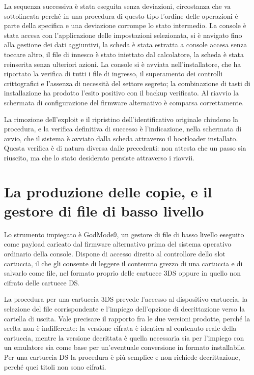 La sequenza successiva è stata eseguita senza deviazioni, circostanza che va sottolineata perché in una procedura di questo tipo l'ordine delle operazioni è parte della specifica e una deviazione corrompe lo stato intermedio. La console è stata accesa con l'applicazione delle impostazioni selezionata, si è navigato fino alla gestione dei dati aggiuntivi, la scheda è stata estratta a console accesa senza toccare altro, il file di innesco è stato iniettato dal calcolatore, la scheda è stata reinserita senza ulteriori azioni. La console si è avviata nell'installatore, che ha riportato la verifica di tutti i file di ingresso, il superamento dei controlli crittografici e l'assenza di necessità del settore segreto; la combinazione di tasti di installazione ha prodotto l'esito positivo con il backup verificato. Al riavvio la schermata di configurazione del firmware alternativo è comparsa correttamente.

La rimozione dell'exploit e il ripristino dell'identificativo originale chiudono la procedura, e la verifica definitiva di successo è l'indicazione, nella schermata di avvio, che il sistema è avviato dalla scheda attraverso il bootloader installato. Questa verifica è di natura diversa dalle precedenti: non attesta che un passo sia riuscito, ma che lo stato desiderato persiste attraverso i riavvii.

\section{La produzione delle copie, e il gestore di file di basso livello}

Lo strumento impiegato è GodMode9, un gestore di file di basso livello eseguito come payload caricato dal firmware alternativo prima del sistema operativo ordinario della console. Dispone di accesso diretto al controllore dello slot cartuccia, il che gli consente di leggere il contenuto grezzo di una cartuccia e di salvarlo come file, nel formato proprio delle cartucce 3DS oppure in quello non cifrato delle cartucce DS.

La procedura per una cartuccia 3DS prevede l'accesso al dispositivo cartuccia, la selezione del file corrispondente e l'impiego dell'opzione di decrittazione verso la cartella di uscita. Vale precisare il rapporto fra le due versioni prodotte, perché la scelta non è indifferente: la versione cifrata è identica al contenuto reale della cartuccia, mentre la versione decrittata è quella necessaria sia per l'impiego con un emulatore sia come base per un'eventuale conversione in formato installabile. Per una cartuccia DS la procedura è più semplice e non richiede decrittazione, perché quei titoli non sono cifrati.

